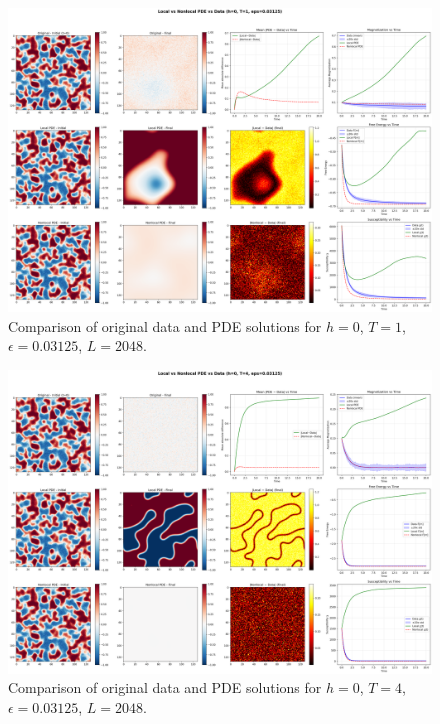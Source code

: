 \documentclass[11pt,a4paper]{article}
\begin{document}

\begin{figure}[!h]
    \centering
    \includegraphics[width=1.0\textwidth]{fig/compare_local_nonlocal_L2048_h0_T1_eps0.03125.png}
    \caption{Comparison of original data and PDE solutions for $h=0$, $T=1$, $\epsilon=0.03125$, $L=2048$.}
    \label{fig:pde_comparison_h0_T1_eps0.03125_L2048}
\end{figure}


\begin{figure}[h]
    \centering
    \includegraphics[width=1.0\textwidth]{fig/compare_local_nonlocal_L2048_h0_T4_eps0.03125.png}
    \caption{Comparison of original data and PDE solutions for $h=0$, $T=4$, $\epsilon=0.03125$, $L=2048$.}
    \label{fig:pde_comparison_h0_T4_eps0.03125_L2048}
\end{figure}
\end{document}
